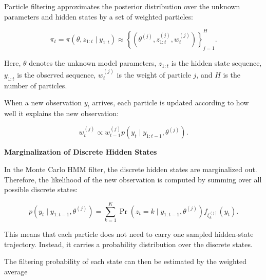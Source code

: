 \documentclass{book}
\providecommand{\ProjectDeepHeading}[2]{%
    \par\medskip\noindent\textbf{#2}\par\smallskip
}
\begin{document}
        Particle filtering approximates the posterior distribution over the unknown parameters and hidden states by a set of weighted particles:
        
        \[
            \ensuremath{\pi}_t
            =
            \ensuremath{\pi}
            \left(
                \ensuremath{\theta},
            z_{1:t}
                \mid
                y_{1:t}
            \right)
            \approx
            \left\{
                \left(
                    \ensuremath{\theta}^{(j)},
                z_{1:t}^{(j)},
                w_t^{(j)}
                \right)
            \right\}_{j=1}^{H}.
        \]
        
        Here, \(\ensuremath{\theta}\) denotes the unknown model parameters, \(z_{1:t}\) is the hidden state sequence, \(y_{1:t}\) is the observed sequence, \(w_t^{(j)}\) is the weight of particle \(j\), and \(H\) is the number of particles.
        
        When a new observation \(y_t\) arrives, each particle is updated according to how well it explains the new observation:
        
        \[
            w_t^{(j)}
            \propto
            w_{t-1}^{(j)}
            p
            \left(
                y_t
                \mid
                y_{1:t-1},
                \ensuremath{\theta}^{(j)}
            \right).
        \]
    
    
    \ProjectDeepHeading{11}{Marginalization of Discrete Hidden States}
        
        In the Monte Carlo HMM filter, the discrete hidden states are marginalized out. Therefore, the likelihood of the new observation is computed by summing over all possible discrete states:
        
        \[
            p
            \left(
                y_t
                \mid
                y_{1:t-1},
                \ensuremath{\theta}^{(j)}
            \right)
            =
            \sum_{k=1}^{K}
            \Pr
            \left(
                z_t = k
                \mid
                y_{1:t-1},
                \ensuremath{\theta}^{(j)}
            \right)
            f_{\ensuremath{\xi}_k^{(j)}}(y_t).
        \]
        
        This means that each particle does not need to carry one sampled hidden-state trajectory. Instead, it carries a probability distribution over the discrete states.
        
        The filtering probability of each state can then be estimated by the weighted average
        
\end{document}
